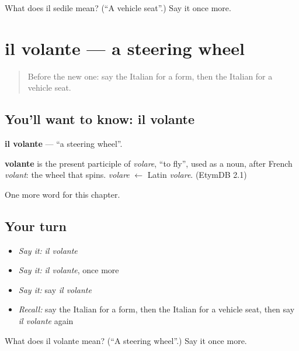 \begin{tcolorbox}[breakable,colback=teal!4,colframe=teal!35!black,title={Before you move on}]
What does il sedile mean? (\textquotedblleft{}A vehicle seat\textquotedblright{}.) Say it once more.
\end{tcolorbox}
\section[il volante]{il volante — a steering wheel}

\label{lesson:IT-C254-volante}



\begin{quote}
Before the new one: say the Italian for a form, then the Italian for a vehicle seat.
\end{quote}

\subsection*{You'll want to know: il volante}
\textbf{il volante} — \textquotedblleft{}a steering wheel\textquotedblright{}.

\begin{cousinweb}
\textbf{volante} is the present participle of \emph{volare}, \textquotedblleft{}to fly\textquotedblright{}, used as a noun, after French \emph{volant}: the wheel that spins. \emph{volare} $\leftarrow$ Latin \emph{volare}. (EtymDB 2.1)
\end{cousinweb}

\begin{grammarlens}[title={What you've built}]
One more word for this chapter.
\end{grammarlens}

\subsection*{Your turn}
\begin{itemize}
\raggedright
  \item \emph{Say it:} \emph{il volante}
  \item \emph{Say it:} \emph{il volante}, once more
  \item \emph{Say it:} say \emph{il volante}
  \item \emph{Recall:} say the Italian for a form, then the Italian for a vehicle seat, then say \emph{il volante} again
\end{itemize}

\begin{tcolorbox}[breakable,colback=teal!4,colframe=teal!35!black,title={Before you move on}]
What does il volante mean? (\textquotedblleft{}A steering wheel\textquotedblright{}.) Say it once more.
\end{tcolorbox}
